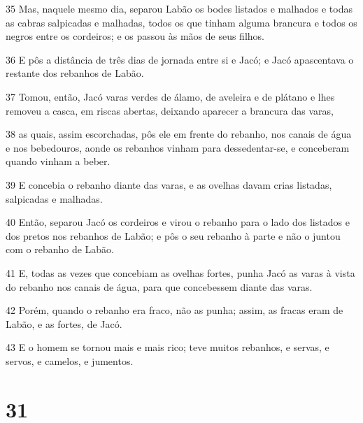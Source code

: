 \par 35 Mas, naquele mesmo dia, separou Labão os bodes listados e malhados e todas as cabras salpicadas e malhadas, todos os que tinham alguma brancura e todos os negros entre os cordeiros; e os passou às mãos de seus filhos.
\par 36 E pôs a distância de três dias de jornada entre si e Jacó; e Jacó apascentava o restante dos rebanhos de Labão.
\par 37 Tomou, então, Jacó varas verdes de álamo, de aveleira e de plátano e lhes removeu a casca, em riscas abertas, deixando aparecer a brancura das varas,
\par 38 as quais, assim escorchadas, pôs ele em frente do rebanho, nos canais de água e nos bebedouros, aonde os rebanhos vinham para dessedentar-se, e conceberam quando vinham a beber.
\par 39 E concebia o rebanho diante das varas, e as ovelhas davam crias listadas, salpicadas e malhadas.
\par 40 Então, separou Jacó os cordeiros e virou o rebanho para o lado dos listados e dos pretos nos rebanhos de Labão; e pôs o seu rebanho à parte e não o juntou com o rebanho de Labão.
\par 41 E, todas as vezes que concebiam as ovelhas fortes, punha Jacó as varas à vista do rebanho nos canais de água, para que concebessem diante das varas.
\par 42 Porém, quando o rebanho era fraco, não as punha; assim, as fracas eram de Labão, e as fortes, de Jacó.
\par 43 E o homem se tornou mais e mais rico; teve muitos rebanhos, e servas, e servos, e camelos, e jumentos.

\chapter{31}

